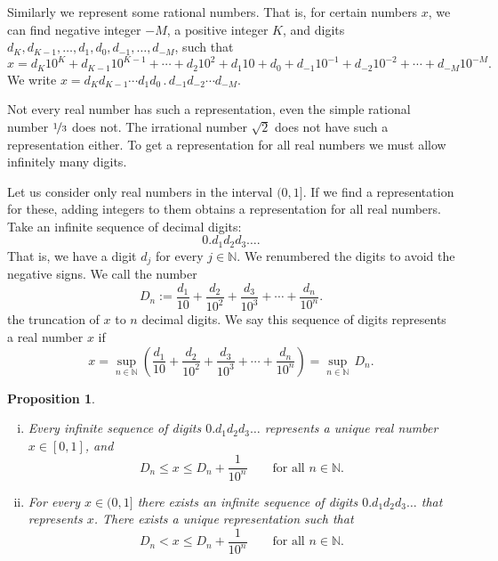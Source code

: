 \documentclass[12pt]{book}
\newcommand{\N}{{\mathbb{N}}}
\theoremstyle{plain}
\newtheorem{prop}[thm]{Proposition}
\theoremstyle{remark}
\theoremstyle{definition}
\theoremstyle{exercise}
\theoremstyle{example}
\begin{document}
Similarly we
represent some rational numbers.  That is, for certain
numbers $x$, we can find
negative integer $-M$, a positive integer $K$, and digits
$d_K,d_{K-1},\ldots,d_1,d_0,d_{-1},\ldots,d_{-M}$, such that
\begin{equation*}
x = d_K {10}^K + d_{K-1} {10}^{K-1} + \cdots + d_2 {10}^2 + d_1 10 + d_0 
+ d_{-1} {10}^{-1} + d_{-2} {10}^{-2} + \cdots + d_{-M} {10}^{-M} .
\end{equation*}
We write $x = d_K d_{K-1} \cdots d_1 d_0 \, . \, d_{-1} d_{-2} \cdots d_{-M}$.

Not every real number has such a representation, even the simple
rational number $\nicefrac{1}{3}$ does not.  The irrational number $\sqrt{2}$ 
does not have such a representation either.  To get a representation for
all real numbers we must allow infinitely many digits.

Let us consider only real numbers in the interval $(0,1]$.  If
we find a representation for these, adding 
integers to them obtains a representation for all real numbers.
Take an infinite sequence of decimal digits:
\begin{equation*}
0.d_1d_2d_3\ldots.
\end{equation*}
That is, we have a digit $d_j$ for every $j \in \N$.
We renumbered the digits to avoid the negative signs.
We call the number
\begin{equation*}
D_n := 
\frac{d_1}{10} + 
\frac{d_2}{{10}^2} + 
\frac{d_3}{{10}^3} + 
\cdots +
\frac{d_n}{{10}^n} .
\end{equation*}
the truncation of $x$ to $n$ decimal digits.
We say this
sequence of digits represents a real number $x$ if
\begin{equation*}
x =
\sup_{n \in \N} \left(
\frac{d_1}{10} + 
\frac{d_2}{{10}^2} + 
\frac{d_3}{{10}^3} + 
\cdots +
\frac{d_n}{{10}^n}
\right) =
\sup_{n \in \N} \, D_n .
\end{equation*}

\begin{prop} \label{prop:decimalprop}
{~}
\begin{enumerate}[(i)]
\item
Every infinite sequence of digits
$0.d_1d_2d_3\ldots$ represents a unique real number $x \in [0,1]$, and
\begin{equation*}
D_n \leq x \leq D_n+\frac{1}{{10}^n} \qquad \text{for all $n \in \N$}.
\end{equation*}
\item
For every $x \in (0,1]$ there exists an infinite sequence of digits
$0.d_1d_2d_3\ldots$ that represents $x$.
There exists a unique representation such that
\begin{equation*}
D_n < x \leq D_n+\frac{1}{{10}^n} \qquad \text{for all $n \in \N$}.
\end{equation*}
\end{enumerate}
\end{prop}
\end{document}
